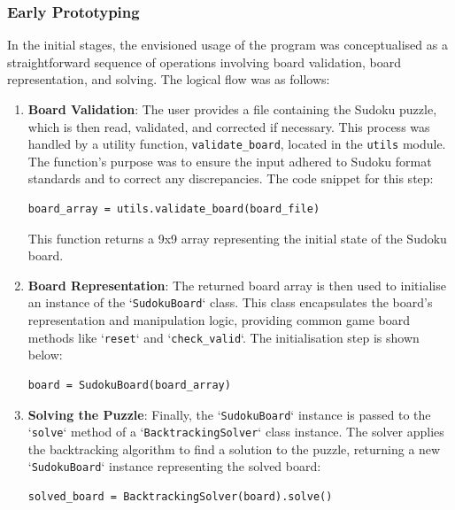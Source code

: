 \documentclass[11pt]{article}
\begin{document}
\subsubsection{Early Prototyping}
In the initial stages, the envisioned usage of the program was conceptualised as a straightforward sequence of operations involving board validation, board representation, and solving. The logical flow was as follows:

\begin{enumerate}
\item \textbf{Board Validation}: The user provides a file containing the Sudoku puzzle, which is then read, validated, and corrected if necessary. This process was handled by a utility function, \texttt{validate\_board}, located in the \texttt{utils} module. The function's purpose was to ensure the input adhered to Sudoku format standards and to correct any discrepancies. The code snippet for this step:
\begin{verbatim}
board_array = utils.validate_board(board_file)
\end{verbatim}
This function returns a 9x9 array representing the initial state of the Sudoku board.

\item \textbf{Board Representation}: The returned board array is then used to initialise an instance of the `\texttt{SudokuBoard}` class. This class encapsulates the board's representation and manipulation logic, providing common game board methods like `\texttt{reset}` and `\texttt{check\_valid}`. The initialisation step is shown below:
\begin{verbatim}
board = SudokuBoard(board_array)
\end{verbatim}

\item \textbf{Solving the Puzzle}: Finally, the `\texttt{SudokuBoard}` instance is passed to the `\texttt{solve}` method of a `\texttt{BacktrackingSolver}` class instance. The solver applies the backtracking algorithm to find a solution to the puzzle, returning a new `\texttt{SudokuBoard}` instance representing the solved board:
\begin{verbatim}
solved_board = BacktrackingSolver(board).solve()
\end{verbatim}

\end{enumerate}
\end{document}
